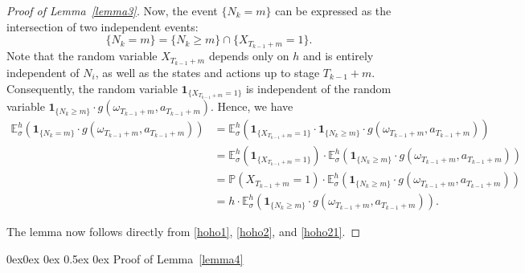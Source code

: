 \documentclass[english,openary,11pt]{article}
\makeatletter
\renewcommand\subsection{\@startsection{subsection}{2}{\z@}%
                                     {0ex\@plus 0ex \@minus 0ex}%
                                     {0.5ex \@plus 0ex}%
                                     {\normalfont\Large\bfseries}}%
\theoremstyle{definition}
\newcommand{\E}{\mathbb{E}}
\renewcommand{\P}{\mathbb{P}}
\makeatother
\begin{document}
\begin{proof}[Proof of Lemma~\ref{lemma3}]
Now, the event $\{N_k = m\}$ can be expressed as the intersection of two independent events: 
$$\{N_k = m\} = \{N_k\ge m\} \cap \{X_{T_{k-1}+m} = 1\}.$$
Note that the random variable $X_{T_{k-1}+m}$ depends only on $h$ and is entirely independent of $N_i$, as well as the states and actions up to stage $T_{k-1}+m$. Consequently, the random variable $\mathbf{1}_{\{X_{T_{k-1}+m} = 1\}}$ is independent of the  random variable $\mathbf{1}_{\{N_k \ge m\}} \cdot g(\omega_{T_{k-1} + m}, a_{T_{k-1} + m})$. Hence, we have 
\begin{equation}
\begin{aligned}
\E_{\sigma}^h \left(\mathbf{1}_{\{N_k = m\}} \cdot g(\omega_{T_{k-1} + m}, a_{T_{k-1} + m})\right) &= \E_{\sigma}^h \left( \mathbf{1}_{\{X_{T_{k-1}+m} = 1\}} \cdot \mathbf{1}_{\{N_k \ge m\}} \cdot g(\omega_{T_{k-1} + m}, a_{T_{k-1} + m})\right) \\
&= \E_{\sigma}^h \left( \mathbf{1}_{\{X_{T_{k-1}+m} = 1\}}\right) \cdot \E_{\sigma}^h \left( \mathbf{1}_{\{N_k \ge m\}} \cdot g(\omega_{T_{k-1} + m}, a_{T_{k-1} + m})\right) \\
&= \P(X_{T_{k-1}+m} = 1) \cdot \E_{\sigma}^h \left( \mathbf{1}_{\{N_k \ge m\}} \cdot g(\omega_{T_{k-1} + m}, a_{T_{k-1} + m})\right) \\
&= h \cdot \E_{\sigma}^h \left( \mathbf{1}_{\{N_k \ge m\}} \cdot g(\omega_{T_{k-1} + m}, a_{T_{k-1} + m})\right).
\end{aligned}
\label{hoho21}
\end{equation}

The lemma now follows directly from \eqref{hoho1}, \eqref{hoho2}, and \eqref{hoho21}.
\end{proof}

\subsection{Proof of Lemma~\ref{lemma4}}
\end{document}
